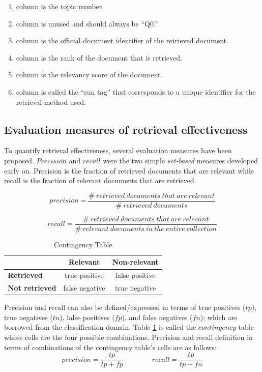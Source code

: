 \begin{enumerate}
\item column is the topic number.
\item column is unused and should always be ``Q0.''
\item column is the official document identifier of the retrieved document.
\item column is the rank of the document that is retrieved.
\item column is the relevancy score of the document.
\item column is called the ``run tag'' that corresponds to a unique identifier for the retrieval method used.
\end{enumerate}

\subsection{Evaluation measures of retrieval effectiveness}
To quantify retrieval effectiveness, several evaluation measures have been proposed.
$Precision$ and $recall$ were the  two simple \emph{set-based} measures developed early on.
Precision is the fraction of retrieved documents that are relevant while recall is the fraction of relevant documents that are retrieved. 

\begin{equation}\label{precision}
precision = \frac{\#\ retrieved\ documents\ that\ are\ relevant}{\#\ retrieved\ documents}
\end{equation}

\begin{equation}\label{recall}
recall = \frac{\#\ retrieved\ documents\ that\ are\ relevant}{\#\ relevant\ documents\ in\ the\ entire\ collection}
\end{equation}

\begin{table}
\caption{Contingency Table}
\label{tbl:con}
\begin{tabular}{ l | c | c }
   &  \bfseries Relevant & \bfseries Non-relevant \\
\hline 
\bfseries Retrieved & true positive & false positive \\
\bfseries Not retrieved & false negative & true negative \\
\end{tabular}
\end{table}

Precision and recall can also be defined/expressed in terms of true positives ($tp$), true negatives ($tn$), false positives ($fp$), and false negatives ($fn$); which are borrowed from the classification domain.
Table \ref{tbl:con} is called the $contingency$ table whose cells are the four possible combinations.
Precision and recall definition in terms of combinations of the contingency table's cells are as follows:
\begin{equation}\label{pr}
precision = \frac{tp}{tp+fp} \qquad  \qquad recall =\frac{tp}{tp+fn}
\end{equation}

